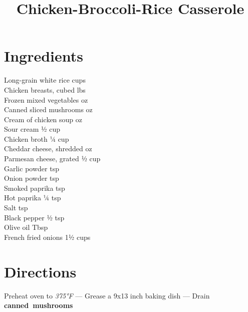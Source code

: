 \documentclass[11pt,letterpaper]{article}
\title{Chicken-Broccoli-Rice Casserole}
\author{}
\date{}
\begin{document}
\maketitle
\thispagestyle{empty}

\section*{Ingredients}
\setlength{\columnsep}{20pt}
\begin{multicols}{2}
\noindent
    Long-grain white rice  cups \\
    Chicken breasts, cubed  lbs \\
    Frozen mixed vegetables  oz \\
    Canned sliced mushrooms  oz \\
    Cream of chicken soup  oz \\
    Sour cream \dotfill ½ cup \\
    Chicken broth \dotfill ¼ cup \\
    Cheddar cheese, shredded  oz \\
    \columnbreak
    Parmesan cheese, grated \dotfill ½ cup \\
    Garlic powder  tsp \\
    Onion powder  tsp \\
    Smoked paprika  tsp \\
    Hot paprika \dotfill ¼ tsp \\
    Salt  tsp \\
    Black pepper \dotfill ½ tsp \\
    Olive oil  Tbsp \\
    French fried onions \dotfill 1½ cups \\
\end{multicols}

\section*{Directions}

\noindent
Preheat oven to \textit{375°F} ---
Grease a 9x13 inch baking dish ---
Drain \textbf{canned~mushrooms}
\end{document}
